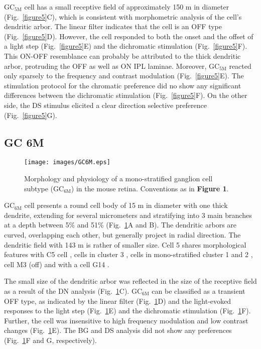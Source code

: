 GC$_{\text{5M}}$ cell has a small receptive field of approximately 150 \textmu m in diameter (Fig.~\ref{figure5}C), which is consistent with morphometric analysis of the cell’s dendritic arbor. The linear filter indicates that the cell is an OFF type (Fig.~\ref{figure5}D). However, the cell responded to both the onset and the offset of a light step (Fig.~\ref{figure5}E) and the dichromatic stimulation (Fig.~\ref{figure5}F). This ON-OFF resemblance can probably be attributed to the thick dendritic arbor, protruding the OFF as well as ON IPL laminae. Moreover, GC$_{\text{5M}}$ reacted only sparsely to the frequency and contrast modulation (Fig.~\ref{figure5}E). The stimulation protocol for the chromatic preference did no show any significant differences between the dichromatic stimulation (Fig.~\ref{figure5}F). On the other side, the DS stimulus elicited a clear direction selective preference  (Fig.~\ref{figure5}G). 


\subsection{GC 6M}     

\begin{figure}[t]
\begin{center}
\texttt{[image: images/GC6M.eps]}
\caption{Morphology and physiology of a mono-stratified ganglion cell subtype (GC$_\text{{6M}}$) in the mouse retina. Conventions as in \textbf{Figure 1}.}
\label{figure6}
\end{center}
\end{figure}

GC$_{\text{6M}}$ cell presents a round cell body of 15 \textmu m in diameter with one thick dendrite, extending for several micrometers and stratifying into 3 main branches at a depth between 5\% and 51\% (Fig.~\ref{figure6}A and B). The dendritic arbors are curved, overlapping each other, but generally project in radial direction. The dendritic field with 143 \textmu m is rather of smaller size. Cell 5 shares morphological features with C5 cell \citep{sun02}, cells in cluster 3 \citep{kong05}, cells in mono-stratified cluster 1 and 2 \citep{badea04}, cell M3 (off) \citep{coombs06} and with a cell G14 \citep{voelgyi09}. 

The small size of the dendritic arbor was reflected in the size of the receptive field as a result of the DN analysis (Fig.~\ref{figure6}C). GC$_{\text{6M}}$ can be classified as a transient OFF type, as indicated by the linear filter (Fig.~\ref{figure6}D) and the light-evoked responses to the light step (Fig.~\ref{figure6}E) and the dichromatic stimulation (Fig.~\ref{figure6}F). Further, the cell was insensitive to high frequency modulation and low contrast changes (Fig.~\ref{figure6}E). The BG and DS analysis did not show any preferences (Fig.~\ref{figure6}F and G, respectively).  


